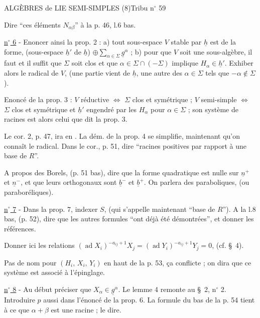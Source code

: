 


ALGÈBRES de LIE SEMI-SIMPLES (8)\hfill Tribu n$^\circ$ 59

Dire ``ces éléments $N_{\alpha\beta}$'' à la p. 46, l.6 bas.

\uline{n$^\circ$ 6} - Enoncer ainsi la prop. 2 : a) tout sous-espace $V$ stable par $\underline h$ est de la
forme, (sous-espace $\underline h'$ de $\underline h$) $\oplus\displaystyle\sum_{\alpha\in\Sigma}\underline g^\alpha$ ; b) pour que $V$ soit une sous-algèbre,
il faut et il suffit que $\Sigma$ soit clos et que $\alpha\in\Sigma\cap(-\Sigma)$ implique $H_\alpha\in\underline h'$.
Exhiber alors le radical de $V$, (une partie vient de $\underline h$, une autre des $\alpha\in\Sigma$
tels que $-\alpha\notin\Sigma$).

Enoncé de la prop. 3 : $V$ réductive $\Longleftrightarrow$ $\Sigma$ clos et symétrique ; $V$ semi-simple $\Longleftrightarrow$
$\Sigma$ clos et symétrique et $\underline h'$ engendré par les $H_\alpha$ pour $\alpha\in\Sigma$ ; son
système de racines est alors celui que dit la prop. 3.

Le cor. 2, p. 47, ira en . La dém. de la prop. 4 se simplifie, maintenant
qu'on connaît le radical. Dans le cor., p. 51, dire ``racines positives par
rapport à une base de $R$''.

A propos des Borels, (p. 51 bas), dire que la forme quadratique est nulle
sur $\underline n^+$ et $\underline n^-$, et que leurs orthogonaux sont $\underline b^-$ et $\underline b^+$.
On parlera des paraboliques, (ou paraboréliques).

\uline{n$^\circ$ 7} - Dans la prop. 7, indexer $S$, (qui s'appelle maintenant ``base de $R$'').
A la l.8 bas, (p. 52), dire que les autres formules ``ont déjà été démontrées'',
et donner les références.

Donner ici les relations $(\operatorname{ad}X_i)^{-a_{ij}+1}X_j=(\operatorname{ad}Y_i)^{-a_{ij}+1}Y_j=0$, (cf. \S\ 4).

Pas de nom pour $(H_i,\,X_i,\,Y_i)$ en haut de la p. 53, ça conflicte ; on dira
que ce système est associé à l'épinglage.

\uline{n$^\circ$ 8} - Au début préciser que $X_\alpha\in\underline g^\alpha$. Le lemme 4 remonte au \S\ 2, n$^\circ$ 2. Introduire
$p$ aussi dans l'énoncé de la prop. 6. La formule du bas de la p. 54 tient
à ce que $\alpha+\beta$ est une racine ; le dire.

